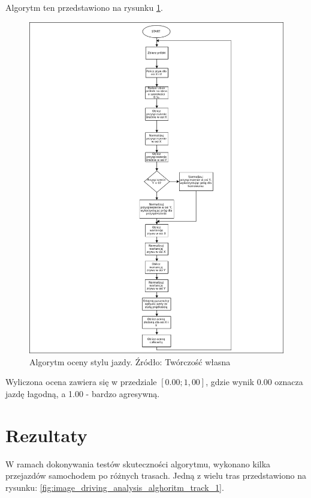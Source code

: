 Algorytm ten przedstawiono na rysunku \ref{fig:image_driving_analysis_alghoritm}.

\begin{figure}[H]
	\centering
	\includegraphics[width=15cm]{img/driving_analysis/driving_analysis.png}
	\caption{Algorytm oceny stylu jazdy. Źródło: Twórczość własna}
	\label{fig:image_driving_analysis_alghoritm}
\end{figure}

Wyliczona ocena zawiera się w przedziale $[0.00; 1,00]$, gdzie wynik 0.00 oznacza jazdę łagodną, a 1.00 - bardzo agresywną. 


\section{Rezultaty}

W ramach dokonywania testów skuteczności algorytmu, wykonano kilka przejazdów samochodem po różnych trasach. Jedną z wielu tras przedstawiono na rysunku: \ref{fig:image_driving_analysis_alghoritm_track_1}.

